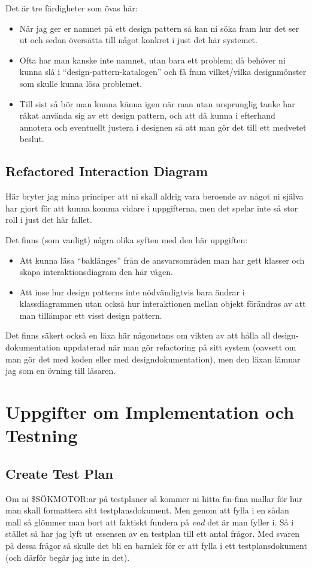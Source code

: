 \documentclass[8pt,oneside]{memoir}
\begin{document}
Det är tre färdigheter som övas här:
\begin{itemize}
\item När jag ger er namnet på ett design pattern så kan ni söka fram hur det ser ut och sedan översätta till något konkret i just det här systemet.
\item Ofta har man kanske inte namnet, utan bara ett problem; då behöver ni kunna slå i ``design-pattern-katalogen'' och få fram vilket/vilka designmönster som skulle kunna lösa problemet.
\item Till sist så bör man kunna känna igen när man utan ursprunglig tanke har råkat använda sig av ett design pattern, och att då kunna i efterhand annotera och eventuellt justera i designen så att man gör det till ett medvetet beslut.
\end{itemize}
\chapter{Refactored Interaction Diagram}
\label{sec:orgdc07b9e}
Här bryter jag mina principer att ni skall aldrig vara beroende av något ni själva har gjort för att kunna komma vidare i uppgifterna, men det spelar inte så stor roll i just det här fallet. 

Det finns (som vanligt) några olika syften med den här uppgiften:
\begin{itemize}
\item Att kunna läsa ``baklänges'' från de ansvarsområden man har gett klasser och skapa interaktionsdiagram den här vägen.
\item Att inse hur design patterns inte nödvändigtvis bara ändrar i klassdiagrammen utan också hur interaktionen mellan objekt förändras av att man tillämpar ett visst design pattern.
\end{itemize}

Det finns säkert också en läxa här någonstans om vikten av att hålla all design-dokumentation uppdaterad när man gör refactoring på sitt system (oavsett om man gör det med koden eller med designdokumentation), men den läxan lämnar jag som en övning till läsaren.
\part{Uppgifter om Implementation och Testning}
\label{sec:org2589c65}
\chapter{Create Test Plan}
\label{sec:orgc8b8b03}
Om ni \$SÖKMOTOR:ar på testplaner så kommer ni hitta fin-fina mallar för hur man skall formattera sitt testplansdokument. Men genom att fylla i en sådan mall så glömmer man bort att faktiskt fundera på \emph{vad} det är man fyller i. Så i stället så har jag lyft ut essensen av en testplan till ett antal frågor. Med svaren på dessa frågor så skulle det bli en barnlek för er att fylla i ett testplansdokument (och därför begär jag inte in det).
\end{document}
